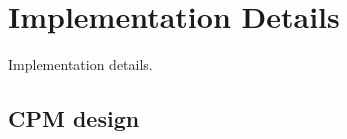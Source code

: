 \chapter{Implementation Details\label{ch:implementation}}

Implementation details.

\section{CPM design}
\label{sec:implementation:cmpdesign}